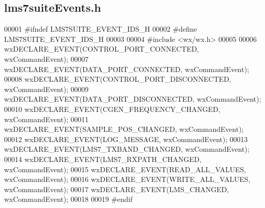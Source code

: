 \subsection{lms7suite\+Events.\+h}
\label{lms7suiteEvents_8h_source}

\begin{DoxyCode}
00001 \textcolor{preprocessor}{#ifndef LMS7SUITE\_EVENT\_IDS\_H}
00002 \textcolor{preprocessor}{#define LMS7SUITE\_EVENT\_IDS\_H}
00003 
00004 \textcolor{preprocessor}{#include <wx/wx.h>}
00005 
00006 wxDECLARE_EVENT(CONTROL\_PORT\_CONNECTED, wxCommandEvent);
00007 wxDECLARE_EVENT(DATA\_PORT\_CONNECTED, wxCommandEvent);
00008 wxDECLARE_EVENT(CONTROL\_PORT\_DISCONNECTED, wxCommandEvent);
00009 wxDECLARE_EVENT(DATA\_PORT\_DISCONNECTED, wxCommandEvent);
00010 wxDECLARE_EVENT(CGEN\_FREQUENCY\_CHANGED, wxCommandEvent);
00011 wxDECLARE_EVENT(SAMPLE\_POS\_CHANGED, wxCommandEvent);
00012 wxDECLARE_EVENT(LOG\_MESSAGE, wxCommandEvent);
00013 wxDECLARE_EVENT(LMS7\_TXBAND\_CHANGED, wxCommandEvent);
00014 wxDECLARE_EVENT(LMS7\_RXPATH\_CHANGED, wxCommandEvent);
00015 wxDECLARE_EVENT(READ\_ALL\_VALUES, wxCommandEvent);
00016 wxDECLARE_EVENT(WRITE\_ALL\_VALUES, wxCommandEvent);
00017 wxDECLARE_EVENT(LMS\_CHANGED, wxCommandEvent);
00018 
00019 \textcolor{preprocessor}{#endif}
\end{DoxyCode}
